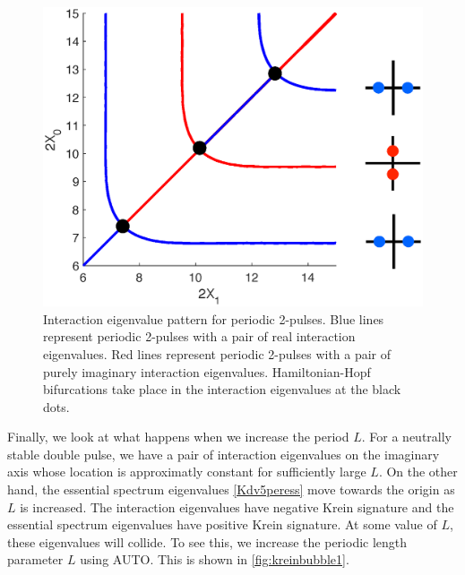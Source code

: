 \documentclass[thesis.tex]{subfiles}
\begin{document}
\begin{figure}[H]
\includegraphics[width=12cm]{images/kdv5numerics/2periodiceigpattern.eps}
\caption{Interaction eigenvalue pattern for periodic 2-pulses. Blue lines represent periodic 2-pulses with a pair of real interaction eigenvalues. Red lines represent periodic 2-pulses with a pair of purely imaginary interaction eigenvalues. Hamiltonian-Hopf bifurcations take place in the interaction eigenvalues at the black dots.}
\label{fig:2periodiceigpattern}
\end{figure}

Finally, we look at what happens when we increase the period $L$. For a neutrally stable double pulse, we have a pair of interaction eigenvalues on the imaginary axis whose location is approximatly constant for sufficiently large $L$. On the other hand, the essential spectrum eigenvalues \cref{Kdv5peress} move towards the origin as $L$ is increased. The interaction eigenvalues have negative Krein signature and the essential spectrum eigenvalues have positive Krein signature. At some value of $L$, these eigenvalues will collide. To see this, we increase the periodic length parameter $L$ using AUTO. This is shown in \cref{fig:kreinbubble1}.
\end{document}
